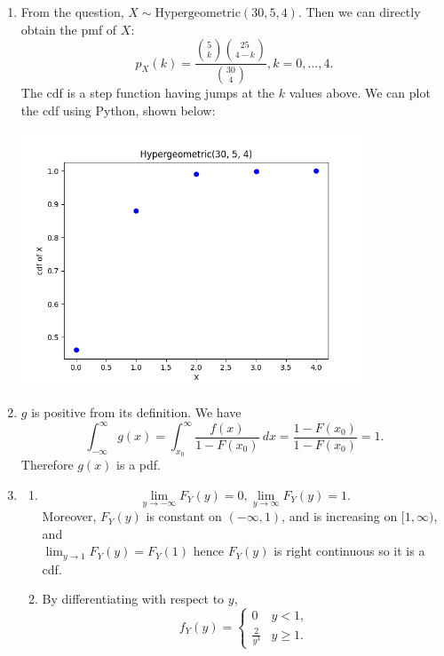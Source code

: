 \documentclass{article}
\begin{document}
\begin{enumerate}
    \item From the question, $X \sim \text{Hypergeometric}(30, 5, 4)$. Then we can directly 
    obtain the pmf of $X$:
    \[ p_{X}(k) = \frac{\binom{5}{k}\binom{25}{4 - k}}{\binom{30}{4}}, k = 0, \dots, 4. \]
    The cdf is a step function having jumps at the $k$ values above. We can plot the cdf using 
    Python, shown below: 
    \begin{center}
        \includegraphics*[width=0.8\textwidth]{../scripts/1-51.png}
    \end{center}

    \item $g$ is positive from its definition. We have 
    \[ \int_{-\infty}^{\infty} g(x) = \int_{x_0}^{\infty} \frac{f(x)}{1 - F(x_0)} \ dx 
    = \frac{1 - F(x_0)}{1 - F(x_0)} = 1. \]
    Therefore $g(x)$ is a pdf.

    \item \begin{enumerate}
        \item \[ \lim_{y \to -\infty} F_{Y}(y) = 0, \lim_{y \to \infty} F_{Y}(y) = 1. \]
        Moreover, $F_{Y}(y)$ is constant on $(-\infty, 1)$, and is increasing on 
        $[1, \infty)$, and \\ $\lim_{y \to 1} F_{Y}(y) = F_{Y}(1)$ hence $F_{Y}(y)$ is 
        right continuous so it is a cdf.

        \item By differentiating with respect to $y$, 
        \[ f_{Y}(y) = \begin{cases}
            0 & y < 1, \\
            \frac{2}{y^3} & y \geq 1.
        \end{cases} \]


\end{enumerate}
\end{enumerate}
\end{document}

